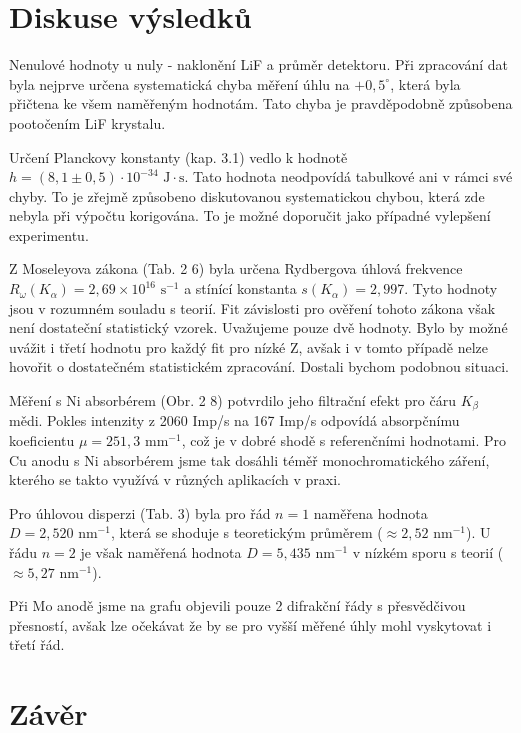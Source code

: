 \section{Diskuse výsledků}
Nenulové hodnoty u nuly - naklonění LiF a průměr detektoru.
Při zpracování dat byla nejprve určena systematická chyba měření úhlu na $+0,5^{\circ}$, která byla přičtena ke všem naměřeným hodnotám. Tato chyba je pravděpodobně způsobena pootočením LiF krystalu.

Určení Planckovy konstanty (kap. 3.1) vedlo k hodnotě $h = (8,1 \pm 0,5) \cdot 10^{-34}\text{ J}\cdot\text{s}$. Tato hodnota neodpovídá tabulkové ani v rámci své chyby. To je zřejmě způsobeno diskutovanou systematickou chybou, která zde nebyla při výpočtu korigována. To je možné doporučit jako případné vylepšení experimentu.

Z Moseleyova zákona (Tab. 2 6) byla určena Rydbergova úhlová frekvence $R_{\omega}(K_{\alpha}) = 2,69 \times 10^{16} \text{ s}^{-1}$ a stínící konstanta $s(K_{\alpha}) = 2,99$7. Tyto hodnoty jsou v rozumném souladu s teorií. Fit závislosti pro ověření tohoto zákona však není dostateční statistický vzorek. Uvažujeme pouze dvě hodnoty. Bylo by možné uvážit i třetí hodnotu pro každý fit pro nízké Z, avšak i v tomto případě nelze hovořit o dostatečném statistickém zpracování. Dostali bychom podobnou situaci.

Měření s Ni absorbérem (Obr. 2 8) potvrdilo jeho filtrační efekt pro čáru $K_{\beta}$ mědi. Pokles intenzity z 2060 Imp/s na 167 Imp/s odpovídá absorpčnímu koeficientu $\mu = 251,3 \text{ mm}^{-1}$, což je v dobré shodě s referenčními hodnotami. Pro Cu anodu s Ni absorbérem jsme tak dosáhli téměř monochromatického záření, kterého se takto využívá v různých aplikacích v praxi.

Pro úhlovou disperzi (Tab. 3) byla pro řád $n=1$ naměřena hodnota $D = 2,520 \text{ nm}^{-1}$, která se shoduje s teoretickým průměrem ($\approx 2,52 \text{ nm}^{-1}$). U řádu $n=2$ je však naměřená hodnota $D = 5,435 \text{ nm}^{-1}$ v nízkém sporu s teorií ($\approx 5,27 \text{ nm}^{-1}$).

Při Mo anodě jsme na grafu objevili pouze 2 difrakční řády s přesvědčivou přesností, avšak lze očekávat že by se pro vyšší měřené úhly mohl vyskytovat i třetí řád.
\section{Závěr}

